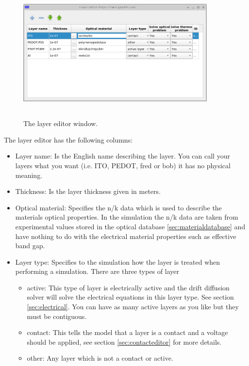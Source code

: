 \begin{figure}[H]
\centering
\includegraphics[width=100mm,height=70mm]{./images/layer_editor.png}
\caption{The layer editor window.}
\label{fig:layereditor}
\end{figure}

The layer editor has the following columns:

\begin{itemize}
  \item Layer name: Is the English name describing the layer. You can call your layers what you want (i.e. ITO, PEDOT, fred or bob) it has no physical meaning.
  \item Thickness: Is the layer thickness given in meters.
  \item Optical material: Specifies the n/k data which is used to describe the materials optical properties. In the simulation the n/k data are taken from experimental values stored in the optical database \ref{sec:materialdatabase} and have nothing to do with the electrical material properties such as effective band gap.
  \item Layer type: Specifies to the simulation how the layer is treated when performing a simulation. There are three types of layer
	\begin{itemize}
	  \item active: This type of layer is electrically active and the drift diffusion solver will solve the electrical equations in this layer type. See section \ref{sec:electrical}. You can have as many active layers as you like but they must be contiguous.
 	  \item contact: This tells the model that a layer is a contact and a voltage should be applied, see section \ref{sec:contacteditor} for more details.
 	  \item other: Any layer which is not a contact or active.

	\end{itemize}
\end{itemize}

